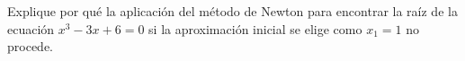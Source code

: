 \item Explique por qué la aplicación del método de Newton para encontrar la raíz de la ecuación $x^3 - 3x + 6 = 0$ si la aproximación inicial se elige como $x_1 = 1$ no procede.
